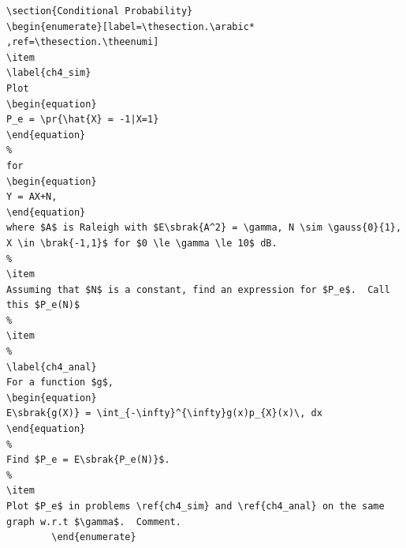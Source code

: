\documentclass[journal,12pt,twocolumn]{IEEEtran}
\renewcommand\thesection{\arabic{section}}
\begin{document}
\begin{enumerate}[label=\thesection.\arabic*,ref=\thesection.\theenumi]
\begin{enumerate}[label=\thesection.\arabic*
,ref=\thesection.\theenumi]
\begin{lstlisting}
\section{Conditional Probability}
\begin{enumerate}[label=\thesection.\arabic*
,ref=\thesection.\theenumi]
\item
\label{ch4_sim}
Plot
\begin{equation}
P_e = \pr{\hat{X} = -1|X=1}
\end{equation}
%
for
\begin{equation}
Y = AX+N,
\end{equation}
where $A$ is Raleigh with $E\sbrak{A^2} = \gamma, N \sim \gauss{0}{1}, X \in \brak{-1,1}$ for $0 \le \gamma \le 10$ dB.
%
\item
Assuming that $N$ is a constant, find an expression for $P_e$.  Call this $P_e(N)$
%
\item
%
\label{ch4_anal}
For a function $g$,
\begin{equation}
E\sbrak{g(X)} = \int_{-\infty}^{\infty}g(x)p_{X}(x)\, dx
\end{equation}
%
Find $P_e = E\sbrak{P_e(N)}$.
%
\item
Plot $P_e$ in problems \ref{ch4_sim} and \ref{ch4_anal} on the same graph w.r.t $\gamma$.  Comment.
		\end{enumerate}

\end{lstlisting}
\end{enumerate}
\end{enumerate}
\end{document}
